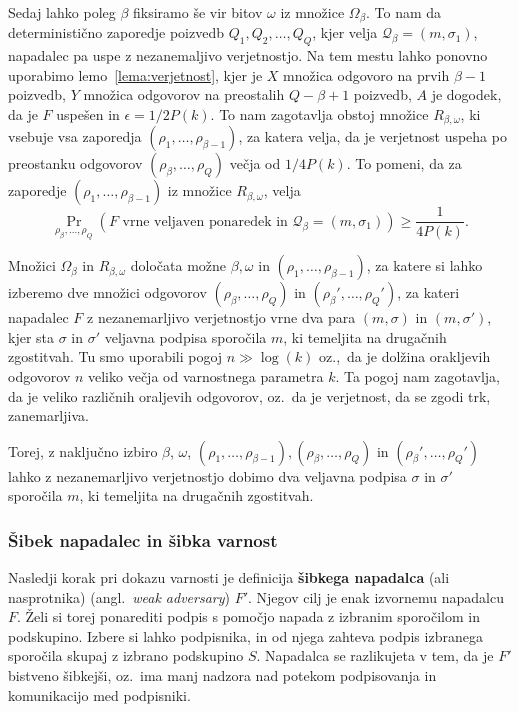 \begin{dokaz}
    Sedaj lahko poleg $\beta$ fiksiramo še vir bitov $\omega$ iz množice $\Omega_\beta$. To nam da
    deterministično zaporedje poizvedb $Q_1, Q_2, \dots, Q_Q$, kjer velja $\mathcal{Q}_\beta =
    (m, \sigma_1)$, napadalec pa uspe z nezanemaljivo verjetnostjo. Na tem mestu lahko ponovno
    uporabimo lemo~\ref{lema:verjetnost}, kjer je $X$ množica odgovoro na prvih $\beta - 1$ poizvedb,
    $Y$ množica odgovorov na preostalih $Q - \beta + 1$ poizvedb, $A$ je dogodek, da je $F$ uspešen
    in $\epsilon = 1/2P(k)$. To nam zagotavlja obstoj množice $R_{\beta, \omega}$, ki vsebuje vsa
    zaporedja $(\rho_1, \dots, \rho_{\beta - 1})$, za katera velja, da je verjetnost uspeha po
    preostanku odgovorov $(\rho_\beta, \dots, \rho_Q)$ večja od $1/4P(k)$. To pomeni, da za
    zaporedje $(\rho_1, \dots, \rho_{\beta - 1})$ iz množice $R_{\beta, \omega}$, velja
    $$
    \Pr_{\rho_\beta, \dots, \rho_Q}(\text{$F$ vrne veljaven ponaredek in } \mathcal{Q}_\beta
    = (m, \sigma_1)) \geq \frac{1}{4P(k)}.
    $$

    Množici $\Omega_\beta$ in $R_{\beta, \omega}$ določata možne $\beta, \omega$ in $(\rho_1, \dots,
    \rho_{\beta - 1})$, za katere si lahko izberemo dve množici odgovorov $(\rho_\beta, \dots, \rho_Q)$
    in $(\rho_\beta', \dots, \rho_Q')$, za kateri napadalec $F$ z nezanemarljivo verjetnostjo vrne
    dva para $(m, \sigma)$ in $(m, \sigma')$, kjer sta $\sigma$ in $\sigma'$ veljavna podpisa sporočila
    $m$, ki temeljita na drugačnih zgostitvah. Tu smo uporabili pogoj $n \gg \log(k)$ oz.,\ da je
    dolžina orakljevih odgovorov $n$ veliko večja od varnostnega parametra $k$. Ta pogoj nam zagotavlja,
    da je veliko različnih oraljevih odgovorov, oz.\ da je verjetnost, da se zgodi trk,
    zanemarljiva.

    Torej, z naključno izbiro $\beta$, $\omega$, $(\rho_1, \dots, \rho_{\beta - 1}), (\rho_\beta, 
    \dots, \rho_Q)$ in $(\rho_\beta', \dots, \rho_Q')$ lahko z nezanemarljivo verjetnostjo dobimo
    dva veljavna podpisa $\sigma$ in $\sigma'$ sporočila $m$, ki temeljita na drugačnih zgostitvah.
\end{dokaz}

\subsubsection{Šibek napadalec in šibka varnost}
Nasledji korak pri dokazu varnosti je definicija \textbf{šibkega napadalca} (ali nasprotnika) (angl.\
\textit{weak adversary}) $F'$. Njegov cilj je enak izvornemu napadalcu $F$. Želi si torej ponarediti podpis
s pomočjo napada z izbranim sporočilom in podskupino. Izbere si lahko podpisnika, in od njega
zahteva podpis izbranega sporočila skupaj z izbrano podskupino $S$. Napadalca se razlikujeta v tem,
da je $F'$ bistveno šibkejši, oz.\ ima manj nadzora nad potekom podpisovanja in komunikacijo med
podpisniki.

